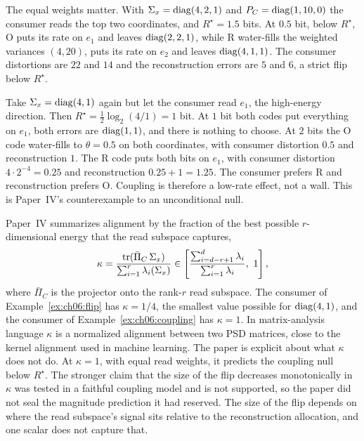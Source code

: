 The equal weights matter. With $\Sigma_x=\operatorname{diag}(4,2,1)$ and $P_C=\operatorname{diag}(1,10,0)$ the consumer reads the top two coordinates, and $R^\star=1.5$ bits. At $0.5$ bit, below $R^\star$, O puts its rate on $e_1$ and leaves $\operatorname{diag}(2,2,1)$, while R water-fills the weighted variances $(4,20)$, puts its rate on $e_2$ and leaves $\operatorname{diag}(4,1,1)$. The consumer distortions are $22$ and $14$ and the reconstruction errors are $5$ and $6$, a strict flip below $R^\star$.

\begin{example}\label{ex:ch06:coupling}
Take $\Sigma_x=\operatorname{diag}(4,1)$ again but let the consumer read $e_1$, the high-energy direction. Then $R^\star=\tfrac12\log_2(4/1)=1$ bit. At $1$ bit both codes put everything on $e_1$, both errors are $\operatorname{diag}(1,1)$, and there is nothing to choose. At $2$ bits the O code water-fills to $\theta=0.5$ on both coordinates, with consumer distortion $0.5$ and reconstruction $1$. The R code puts both bits on $e_1$, with consumer distortion $4\cdot2^{-4}=0.25$ and reconstruction $0.25+1=1.25$. The consumer prefers R and reconstruction prefers O. Coupling is therefore a low-rate effect, not a wall. This is Paper~IV's counterexample to an unconditional null.
\end{example}

Paper~IV summarizes alignment by the fraction of the best possible $r$-dimensional energy that the read subspace captures,
\begin{equation}\label{eq:ch06:kappa}
\kappa=\frac{\tr(\bar\Pi_C\,\Sigma_x)}{\sum_{i=1}^r\lambda_i(\Sigma_x)}\in\left[\frac{\sum_{i=d-r+1}^d\lambda_i}{\sum_{i=1}^r\lambda_i},\ 1\right],
\end{equation}
where $\bar\Pi_C$ is the projector onto the rank-$r$ read subspace. The consumer of Example~\ref{ex:ch06:flip} has $\kappa=1/4$, the smallest value possible for $\operatorname{diag}(4,1)$, and the consumer of Example~\ref{ex:ch06:coupling} has $\kappa=1$. In matrix-analysis language $\kappa$ is a normalized alignment between two PSD matrices, close to the kernel alignment used in machine learning. The paper is explicit about what $\kappa$ does not do. At $\kappa=1$, with equal read weights, it predicts the coupling null below $R^\star$. The stronger claim that the size of the flip decreases monotonically in $\kappa$ was tested in a faithful coupling model and is not supported, so the paper did not seal the magnitude prediction it had reserved. The size of the flip depends on where the read subspace's signal sits relative to the reconstruction allocation, and one scalar does not capture that.

